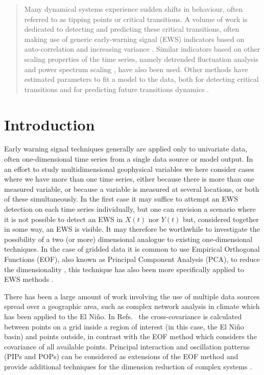 \documentclass[%
aip,
amsmath,amssymb,
reprint,%
]{revtex4-1}
\begin{document}
\begin{quotation}
	Many dynamical systems experience sudden shifts in behaviour, often referred to as tipping points or critical transitions. A volume of work is dedicated to detecting and predicting these critical transitions, often making use of generic early-warning signal (EWS) indicators based on auto-correlation \cite{held2004,dakos2008} and increasing variance \cite{carpenter2006,scheffer2009}. Similar indicators based on other scaling properties of the time series, namely detrended fluctuation analysis \cite{kantelhardt2001,livina2007} and power spectrum scaling \cite{prettyman2018}, have also been used. Other methods have estimated parameters to fit a model to the data, both for detecting critical transitions \cite{livina2010,livina2011,lenton2012} and for predicting future transitions dynamics \cite{livina2013,kwasniok2018}.
\end{quotation}

\section{Introduction}
\label{sec:Intro}

Early warning signal techniques generally are applied only to univariate data, often one-dimensional time series from a single data source or model output. In an effort to study multidimensional geophysical variables we here consider cases where we have more than one time series, either because there is more than one measured variable, or because a variable is measured at several locations, or both of these simultaneously. In the first case it may suffice to attempt an EWS detection on each time series individually, but one can envision a scenario where it is not possible to detect an EWS in $X(t)$ nor $Y(t)$ but, considered together in some way, an EWS is visible. It may therefore be worthwhile to investigate the possibility of a two (or more) dimensional analogue to existing one-dimensional techniques. In the case of gridded data it is common to use Empirical Orthogonal Functions (EOF), also known as Principal Component Analysis (PCA), to reduce the dimensionality \cite{vonstorch,jolliffe1986}, this technique has also been more specifically applied to EWS methods \cite{held2004,bathiany2013part1,kwasniok2018}.

There has been a large amount of work involving the use of multiple data sources spread over a geographic area, such as complex network analysis in climate \cite{tsonis2006,yamasaki2008,gozolchiani2011} which has been applied to the El Ni{\~n}o. In Refs.~ the cross-covariance is calculated between points on a grid inside a region of interest (in this case, the El Ni\~{n}o basin) and points outside, in contrast with the EOF method which considers the  covariance of all available points. Principal interaction and oscillation patterns (PIPs and POPs) can be considered as extensions of the EOF method and provide additional techniques for the dimension reduction of complex systems \cite{hasselmann1988}.
\end{document}
